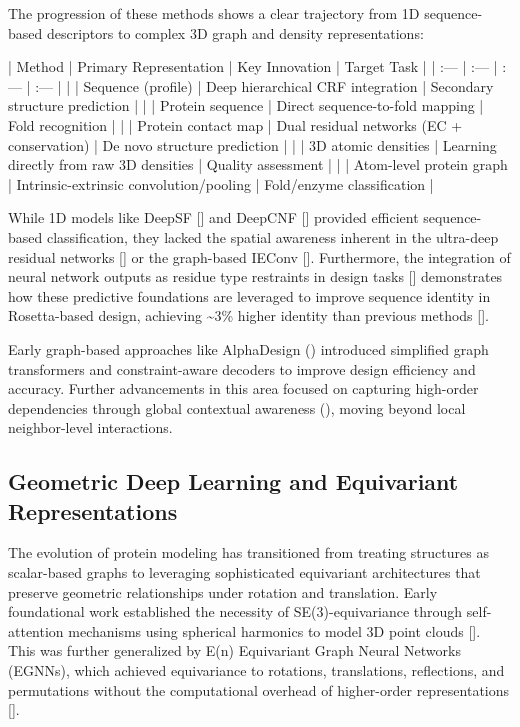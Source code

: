 \documentclass[11pt]{article}
\begin{document}
The progression of these methods shows a clear trajectory from 1D sequence-based descriptors to complex 3D graph and density representations:

| Method | Primary Representation | Key Innovation | Target Task |
| :--- | :--- | :--- | :--- |
| \citep{1512.00843} | Sequence (profile) | Deep hierarchical CRF integration | Secondary structure prediction |
| \citep{1706.01010} | Protein sequence | Direct sequence-to-fold mapping | Fold recognition |
| \citep{1609.00680} | Protein contact map | Dual residual networks (EC + conservation) | De novo structure prediction |
| \citep{1801.06252} | 3D atomic densities | Learning directly from raw 3D densities | Quality assessment |
| \citep{2007.06252} | Atom-level protein graph | Intrinsic-extrinsic convolution/pooling | Fold/enzyme classification |

While 1D models like DeepSF [\citep{1706.01010}] and DeepCNF [\citep{1512.00843}] provided efficient sequence-based classification, they lacked the spatial awareness inherent in the ultra-deep residual networks [\citep{1609.00680}] or the graph-based IEConv [\citep{2007.06252}]. Furthermore, the integration of neural network outputs as residue type restraints in design tasks [\citep{1801.07130}] demonstrates how these predictive foundations are leveraged to improve sequence identity in Rosetta-based design, achieving \textasciitilde{}3\% higher identity than previous methods [\citep{1801.07130}].

Early graph-based approaches like AlphaDesign (\citep{2202.01079}) introduced simplified graph transformers and constraint-aware decoders to improve design efficiency and accuracy. Further advancements in this area focused on capturing high-order dependencies through global contextual awareness (\citep{2204.10673}), moving beyond local neighbor-level interactions.
\subsection{Geometric Deep Learning and Equivariant Representations}

The evolution of protein modeling has transitioned from treating structures as scalar-based graphs to leveraging sophisticated equivariant architectures that preserve geometric relationships under rotation and translation. Early foundational work established the necessity of SE(3)-equivariance through self-attention mechanisms using spherical harmonics to model 3D point clouds [\citep{2006.10503}]. This was further generalized by E(n) Equivariant Graph Neural Networks (EGNNs), which achieved equivariance to rotations, translations, reflections, and permutations without the computational overhead of higher-order representations [\citep{2102.09844}].
\end{document}
